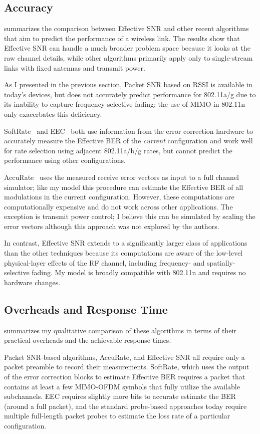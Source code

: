\subsection{Accuracy}
 summarizes the comparison between Effective SNR and other recent algorithms that aim to predict the performance of a wireless link. The results show that Effective SNR can handle a much broader problem space because it looks at the raw channel details, while other algorithms primarily apply only to single-stream links with fixed antennas and transmit power.

As I presented in the previous section, Packet SNR based on RSSI is available in today's devices, but does not accurately predict performance for 802.11a/g due to its inability to capture frequency-selective fading; the use of MIMO in 802.11n only exacerbates this deficiency.

SoftRate~\cite{Vutukuru_SoftRate} and EEC~\cite{Chen_EEC} both use information from the error correction hardware to accurately measure the Effective BER of the \emph{current} configuration and work well for rate selection using adjacent 802.11a/b/g rates, but cannot predict the performance using other configurations.

AccuRate~\cite{Sen_AccuRate} uses the measured receive error vectors as input to a full channel simulator; like my model this procedure can estimate the Effective BER of all modulations in the current configuration. However, these computations are computationally expensive and do not work across other applications. The exception is transmit power control; I believe this can be simulated by scaling the error vectors although this approach was not explored by the authors.

In contrast, Effective SNR extends to a significantly larger class of applications than the other techniques because its computations are aware of the low-level physical-layer effects of the RF channel, including frequency- and spatially-selective fading. My model is broadly compatible with 802.11n and requires no hardware changes.

\subsection{Overheads and Response Time}
 summarizes my qualitative comparison of these algorithms in terms of their practical overheads and the achievable response times.

Packet SNR-based algorithms, AccuRate, and Effective SNR all require only a packet preamble to record their measurements. SoftRate, which uses the output of the error correction blocks to estimate Effective BER requires a packet that contains at least a few MIMO-OFDM symbols that fully utilize the available subchannels. EEC requires slightly more bits to accurate estimate the BER (around a full packet), and the standard probe-based approaches today require multiple full-length packet probes to estimate the loss rate of a particular configuration.

